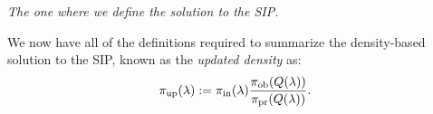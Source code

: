 \begin{frame}[t]{\it The one where we define the solution to the SIP.}

We now have all of the definitions required to summarize the density-based solution to the SIP, known as the \emph{updated density} as:
\vskip 10pt
\begin{equation}\label{eq:updated-pdf}
	\operatorname*{\pi_{up}}(\lambda) := \operatorname*{\pi_{in}}(\lambda)\frac{\operatorname*{\pi_{ob}}(Q(\lambda))}{\operatorname*{\pi_{pr}}(Q(\lambda))}.
\end{equation}

\end{frame}

%
%
%
%
%
%
%
